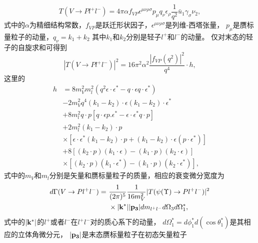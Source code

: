 \begin{equation}
T(V \to P l^{+}l^{-}) = 4 \pi \alpha f_{V\!P}\epsilon^{\mu\nu\rho\sigma}p_{\mu}q_{\nu}\epsilon_{\rho}\frac{1}{q^{2}}\bar{u}_{1} \gamma_{\sigma} \nu_{2},
\end{equation}
式中的$\alpha$为精细结构常数，$f_{V\!P}$是跃迁形状因子，$\epsilon^{\mu\nu\rho\sigma}$是列维-西塔张量，
$p_{\mu}$是赝标量粒子的动量，$q_{\nu} = k_{1}+k_{2}$ 其中$k_{1}$和$k_{2}$分别是轻子$l^{+}$和$l^{-}$的动量。
仅对末态的轻子的自旋求和可得到
\begin{equation}
    |T(V \to P l^{+} l^{-})|^{2} = 16\pi^{2}\alpha^{2}\frac{|f_{V\!P}(q^{2})|^{2}}{q^{4}} \cdot h ,
\end{equation}
这里的
\begin{equation}
\begin{split}
    h &=  8 m^{2}_{V} m^{2}_{l} (q^{2} \epsilon \cdot \epsilon^{*} - q \cdot \epsilon  q \cdot \epsilon^{*} ) \\
       & -2 m^{2}_{V} q^{4}(k_{1} - k_{2} )\cdot \epsilon (k_{1}  - k_{2}) \cdot \epsilon^{*}
      \\ & +8m^{2}_{l} q\cdot p
        [q \cdot \epsilon  p.\epsilon^{*} - \epsilon \cdot \epsilon^{*} q \cdot p]
      \\ & +2m^{2}_{l}(k_{1} - k_{2} )\cdot p
      \\ & \times [\epsilon \cdot \epsilon^{*}(k_{1} - k_{2} )\cdot p + (k_{1}  - k_{2} ) \cdot \epsilon (p\cdot\epsilon^{*})]
      \\ & +8 [(k_{2} \cdot p)(k_{1}\cdot \epsilon)  - (k_{1} \cdot p)(k_{2} \cdot \epsilon)]
      \\ & \times [(k_{2} \cdot p)(k_{1}\cdot \epsilon^{*})  - (k_{1} \cdot p)(k_{2} \cdot \epsilon^{*})] ,
\end{split}
\end{equation}
式中的$m_V$和$m_l$分别是矢量和赝标量粒子的质量，相应的衰变微分宽度为
\begin{equation}
\label{eq:width-PVLL}
\begin{split}
    d\Gamma(V\to Pl^{+}l^{-})=~& \frac{1}{(2\pi){}^{5}} \frac{1}{16m_{V}^{2}} |T(\psi(\Upsilon) \to P l^{+} l^{-})|^{2} \\ & \times {\bf |k^{*}|}{\bf |p_{3}|} dm_{l^{+}l^{-}} d\Omega_{3}d\Omega^{*}_{1},
\end{split}
\end{equation}
式中的$\bf |k^{*}|$的$l^{+}$或者$l^{-}$在$l^{+} l^{-}$对的质心系下的动量，
$d\Omega^{*}_{1} = d \phi^{*}_{1}d(\cos\theta^{*}_{1})$是其相应的立体角微分元，
$\bf |p_{3}|$是末态赝标量粒子在初态矢量粒子
